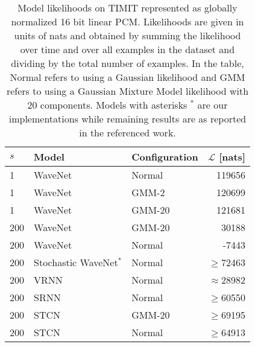 {\begin{table}[t!]
    \caption{
    Model likelihoods on TIMIT represented as globally normalized 16 bit linear PCM. Likelihoods are given in units of nats and obtained by summing the likelihood over time and over all examples in the dataset and dividing by the total number of examples. In the table, Normal refers to using a Gaussian likelihood and GMM refers to using a  Gaussian Mixture Model likelihood with 20 components. Models with asterisks $^*$ are our implementations while remaining results are as reported in the referenced work.
    }
    \centering
    \begin{tabular}{lll|r}
        \toprule
        $s$ & \bf Model           & \bf Configuration           & \bf $\mathcal{L}$ [nats] \\
        \midrule
        1 & WaveNet                                                               & Normal & 119656 \\
        1 & WaveNet                                                               & GMM-2  & 120699 \\
        1 & WaveNet                                                               & GMM-20 & 121681 \\
        \midrule
        200 & WaveNet {\scriptsize \parencite{aksan_stcn_2019}}                        & GMM-20    & 30188 \\
        200 & WaveNet {\scriptsize \parencite{aksan_stcn_2019}}                        & Normal & -7443 \\
        200 & Stochastic WaveNet$^*$ {\scriptsize \parencite{lai_stochastic_2018}}     & Normal & $\geq$72463\\
        200 & VRNN {\scriptsize \parencite{chung_recurrent_2015}}                      & Normal & $\approx$28982\\
        200 & SRNN {\scriptsize \parencite{fraccaro_sequential_2016}}                  & Normal & $\geq$60550 \\
        200 & STCN {\scriptsize \parencite{aksan_stcn_2019}}                           & GMM-20 & $\geq$69195\\
        200 & STCN {\scriptsize \parencite{aksan_stcn_2019}}                           & Normal & $\geq$64913\\

\end{tabular}
\end{table}}
